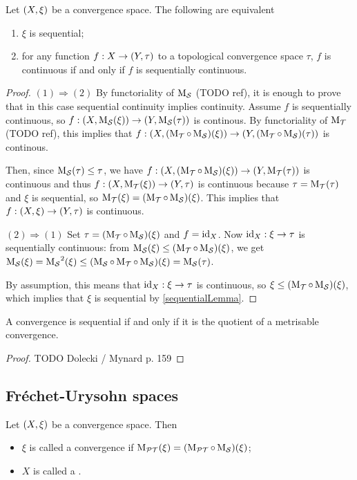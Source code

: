 \begin{proposition} \label{sequentialSpaceSequentialContinuity}
Let $\sSet{X,\xi}$ be a convergence space. The following are equivalent
\begin{enumerate}
\item $\xi$ is sequential;
\item for any function $f: X\to \sSet{Y,\tau}$ to a topological convergence space $\tau$, $f$ is continuous \textup{if and only if} $f$ is sequentially continuous.
\end{enumerate}
\end{proposition}
\begin{proof}
$(1) \Rightarrow (2)$ By functoriality of $\operatorname{M_\mathcal{S}}$ (TODO ref), it is enough to prove that in this case sequential continuity implies continuity. Assume $f$ is sequentially continuous, so $f: \sSet{X, \seqMod(\xi)} \to \sSet{Y, \seqMod(\tau)}$ is continous. By functoriality of $\operatorname{M_\mathcal{T}}$ (TODO ref), this implies that $f: \sSet{X, (\topMod\circ \seqMod)(\xi)} \to \sSet{Y, (\topMod\circ\seqMod)(\tau)}$ is continous.

Then, since $\operatorname{M_\mathcal{S}}(\tau) \leq \tau$, we have $f: \sSet{X, (\topMod\circ \seqMod)(\xi)} \to \sSet{Y, \topMod(\tau)}$ is continuous and thus $f: \sSet{X, \topMod(\xi)} \to \sSet{Y, \tau}$ is continuous because $\tau = \operatorname{M_\mathcal{T}}(\tau)$ and $\xi$ is sequential, so $\operatorname{M_\mathcal{T}}(\xi) = (\operatorname{M_\mathcal{T}}\circ \operatorname{M_\mathcal{S}})(\xi)$. This implies that $f: \sSet{X, \xi} \to \sSet{Y, \tau}$ is continuous.

$(2) \Rightarrow (1)$ Set $\tau = (\operatorname{M_\mathcal{T}}\circ \operatorname{M_\mathcal{S}})(\xi)$ and $f = \operatorname{id}_X$. Now $\operatorname{id}_X: \xi \to \tau$ is sequentially continuous: from $\operatorname{M_\mathcal{S}}(\xi) \leq (\operatorname{M_\mathcal{T}}\circ \operatorname{M_\mathcal{S}})(\xi)$, we get $\operatorname{M_\mathcal{S}}(\xi) = \operatorname{M_\mathcal{S}}^2(\xi) \leq (\operatorname{M_\mathcal{S}}\circ \operatorname{M_\mathcal{T}}\circ \operatorname{M_\mathcal{S}})(\xi) = \operatorname{M_\mathcal{S}}(\tau)$.

By assumption, this means that $\operatorname{id}_X: \xi \to \tau$ is continuous, so $\xi \leq (\operatorname{M_\mathcal{T}}\circ \operatorname{M_\mathcal{S}})(\xi)$, which implies that $\xi$ is sequential by \ref{sequentialLemma}.
\end{proof}

\begin{theorem}
A convergence is sequential \textup{if and only if} it is the quotient of a metrisable convergence.
\end{theorem}
\begin{proof}
TODO Dolecki / Mynard p. 159
\end{proof}

\subsection{Fréchet-Urysohn spaces}
\begin{definition}
Let $\sSet{X,\xi}$ be a convergence space. Then
\begin{itemize}
\item $\xi$ is called a  convergence if $\operatorname{M_\mathcal{PT}}(\xi) = (\operatorname{M_\mathcal{PT}}\circ \operatorname{M_\mathcal{S}})(\xi)$;
\item $X$ is called a .
\end{itemize} 
\end{definition}

